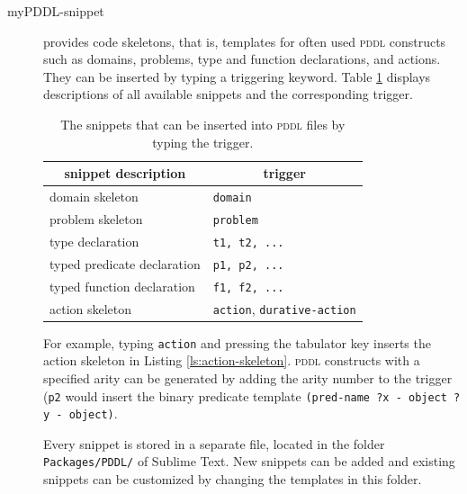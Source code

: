 \documentclass[runningheads]{llncs}
\newcommand{\tableheadline}[1]{\multicolumn{1}{c}{#1}}
\newcommand{\mypddl}{\textsc{myPddl}\xspace}
\newcommand{\pddl}{\textsc{pddl}\xspace}
\begin{document}
\begin{description}
\item[myPDDL-snippet] provides code skeletons, that is, templates for
  often used \pddl constructs such as domains, problems, type and
  function declarations, and actions. They can be inserted by typing a
  triggering keyword. Table \ref{tab:snippets} displays descriptions
  of all available snippets and the corresponding trigger.

\begin{table}[htb]
  \centering
  \caption[Available snippets in \mypddl-snippet]{\label{tab:snippets}The snippets that can be inserted into \pddl files by typing the trigger.}
\begin{tabular}{ll}
  \tableheadline{snippet description} & \tableheadline{trigger}                   \\
  \hline
  domain skeleton                     & \texttt{domain}                           \\
  problem skeleton                    & \texttt{problem}                          \\
  type declaration                    & \texttt{t1, t2, ...}                      \\
  typed predicate declaration         & \texttt{p1, p2, ...}                     \\ 
  typed function declaration          & \texttt{f1, f2, ...}                     \\
  action skeleton                     & \texttt{action}, \texttt{durative-action} \\
\end{tabular}
\end{table}

For example, typing \texttt{action} and pressing the tabulator key
inserts the action skeleton in Listing \ref{ls:action-skeleton}. \pddl
constructs with a specified arity can be generated by adding the arity
number to the trigger (\texttt{p2} would insert the binary predicate
template \texttt{(pred-name~?x~-~object~?y~-~object)}.

Every snippet is stored in a separate file, located in the folder
\texttt{Packages/PDDL/} of Sublime Text. New snippets can be added and
existing snippets can be customized by changing the templates in this
folder.


\end{description}
\end{document}
